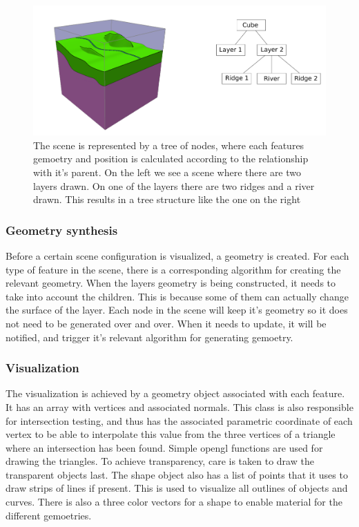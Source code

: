 \documentclass[a4paper,12pt]{article}
\begin{document}
\begin{figure}
 \includegraphics[width=\linewidth]{thesis/tree.pdf}
 \caption{The scene is represented by a tree of nodes, where each features gemoetry and position is calculated according to the relationship with it's parent. On the left we see a scene where there are two layers drawn. On one of the layers there are two ridges and a river drawn. This results in a tree structure like the one on the right}
 \label{fig:tree}
\end{figure}


\subsubsection{Geometry synthesis}
Before a certain scene configuration is visualized, a geometry is created. For each type of feature in the scene, there is a corresponding algorithm for creating the relevant geometry. When the layers geometry is being constructed, it needs to take into account the children. This is because some of them can actually change the surface of the layer. Each node in the scene will keep it's geometry so it does not need to be generated over and over. When it needs to update, it will be notified, and trigger it's relevant algorithm for generating gemoetry.

\subsubsection{Visualization}
The visualization is achieved by a geometry object associated with each feature. It has an array with vertices and associated normals. This class is also responsible for intersection testing, and thus has the associated parametric coordinate of each vertex to be able to interpolate this value from the three vertices of a triangle where an intersection has been found. Simple opengl functions are used for drawing the triangles. To achieve transparency, care is taken to draw the transparent objects last. The shape object also has a list of points that it uses to draw strips of lines if present. This is used to visualize all outlines of objects and curves. There is also a three color vectors for a shape to enable material for the different gemoetries.
\end{document}
